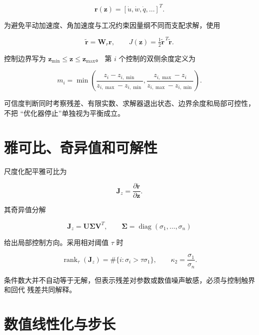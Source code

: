 \documentclass[UTF8,12pt,oneside,openany,fontset=windows]{ctexbook}
\begin{document}
\begin{equation}
\mathbf r(\mathbf z)=[\dot u,\dot w,\dot q,\ldots]^T .
\end{equation}

为避免平动加速度、角加速度与工况约束因量纲不同而支配求解，使用

\begin{equation}
\widetilde{\mathbf r}=\mathbf W_r\mathbf r,\qquad
J(\mathbf z)=\tfrac12\widetilde{\mathbf r}^{\,T}\widetilde{\mathbf r}.
\end{equation}

控制边界写为 \(\mathbf z_{\min}\le\mathbf z\le\mathbf z_{\max}\)。 第 \(i\) 个控制的双侧余度定义为

\begin{equation}
m_i=\min\left(\frac{z_i-z_{i,\min}}{z_{i,\max}-z_{i,\min}},
\frac{z_{i,\max}-z_i}{z_{i,\max}-z_{i,\min}}\right).
\end{equation}

可信度判断同时考察残差、有限实数、求解器退出状态、边界余度和局部可控性，不把 “优化器停止”单独视为平衡成立。

\section{雅可比、奇异值和可解性}

尺度化配平雅可比为

\begin{equation}
\mathbf J_z=\frac{\partial\widetilde{\mathbf r}}{\partial\mathbf z}.
\end{equation}

其奇异值分解

\begin{equation}
\mathbf J_z=\mathbf U\boldsymbol\Sigma\mathbf V^T,\qquad
\boldsymbol\Sigma=\operatorname{diag}(\sigma_1,\ldots,\sigma_n)
\end{equation}

给出局部控制方向。采用相对阈值 \(\tau\) 时

\begin{equation}
\operatorname{rank}_\tau(\mathbf J_z)=
\#\{i:\sigma_i>\tau\sigma_1\},\qquad
\kappa_2=\frac{\sigma_1}{\sigma_n}.
\end{equation}

条件数大并不自动等于无解，但表示残差对参数或数值噪声敏感，必须与控制触界和回代 残差共同解释。

\section{数值线性化与步长}
\end{document}
